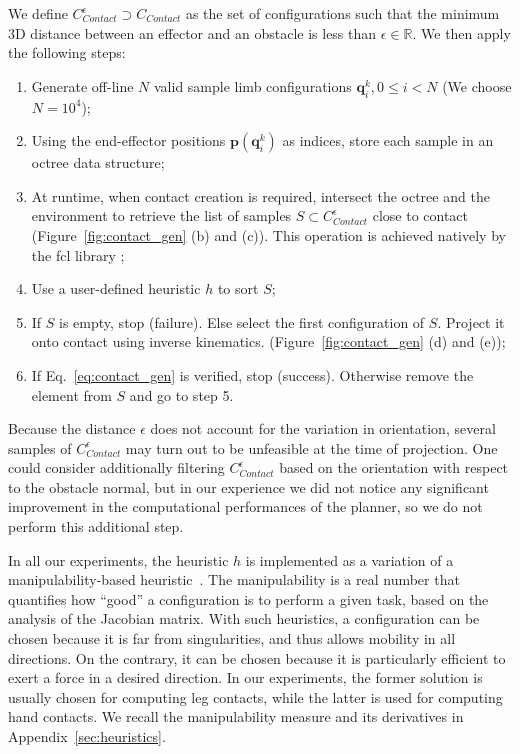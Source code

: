 \documentclass[journal]{IEEEtran}
\begin{document}

We define $C_{Contact}^{\epsilon} \supset C_{Contact}$ as the set of configurations such that the minimum 3D distance 
between an effector and an obstacle is less than $\epsilon \in \mathbb{R}$.
We then apply the following steps:
\begin{enumerate}
\item Generate off-line $N$ valid sample limb configurations $\mathbf{q}^k_i,  0 \leq i < N$ (We choose $N=10^4$);
\item Using the end-effector positions $\mathbf{p}(\mathbf{q}^k_i)$ as indices, store each sample in an octree data structure;
\item At runtime, when contact creation is required, intersect the octree and the environment to retrieve the list of samples $S \subset C_{Contact}^{\epsilon}$ close to contact (Figure~\ref{fig:contact_gen} (b) and (c)). This operation is achieved natively by the fcl library \cite{6225337};
\item Use a user-defined heuristic $h$ to sort $S$;
\item If $S$ is empty, stop (failure). Else select the first configuration of $S$. Project it onto contact using inverse kinematics. (Figure~\ref{fig:contact_gen} (d) and (e));
\item If Eq.~\ref{eq:contact_gen} is verified, stop (success). Otherwise remove the element from $S$ and go to step 5.
\end{enumerate}

Because the distance $\epsilon$ does not account for the variation in orientation, several samples of $ C_{Contact}^{\epsilon}$  may turn out to be unfeasible at the time of projection. One could consider additionally filtering $ C_{Contact}^{\epsilon}$ based on the orientation with respect to the obstacle normal, but in our experience we did not notice
any significant improvement in the computational performances of the planner, so we do not perform this additional step. 
 
In all our experiments, the heuristic $h$ is implemented as a variation of a manipulability-based heuristic~\cite{Yoshikawa1984}. The manipulability is a real number that quantifies how 
``good'' a configuration is to perform a given task, based on the analysis of the Jacobian matrix. With such heuristics, a configuration can be chosen because it is far from singularities, and thus allows mobility in all directions. On the contrary, it can be chosen because it is particularly efficient to exert a force in a desired direction. In our experiments, the former solution is usually chosen for computing leg contacts, while the latter is used for computing hand contacts. We recall the manipulability measure and its derivatives in Appendix~\ref{sec:heuristics}.
\end{document}
